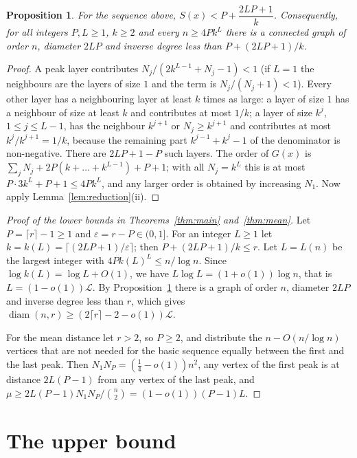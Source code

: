 \documentclass[11pt]{amsart}
\newtheorem{proposition}[theorem]{Proposition}
\theoremstyle{definition}
\theoremstyle{remark}
\newcommand{\diam}{\operatorname{diam}}
\newcommand{\Lz}{\mathcal{L}}
\begin{document}
\begin{proposition}\label{prop:lower}
For the sequence above, $S(x)<P+\dfrac{2LP+1}{k}$.
Consequently, for all integers $P,L\ge1$, $k\ge2$ and every $n\ge 4Pk^L$ there is a connected graph of order $n$, diameter $2LP$ and inverse degree less than $P+(2LP+1)/k$.
\end{proposition}

\begin{proof}
A peak layer contributes $N_j/(2k^{L-1}+N_j-1)<1$ (if $L=1$ the neighbours are the layers of size $1$ and the term is $N_j/(N_j+1)<1$).
Every other layer has a neighbouring layer at least $k$ times as large: a layer of size $1$ has a neighbour of size at least $k$ and contributes at most $1/k$; a layer of size $k^j$, $1\le j\le L-1$, has the neighbour $k^{j+1}$ or $N_j\ge k^{j+1}$ and contributes at most $k^j/k^{j+1}=1/k$, because the remaining part $k^{j-1}+k^j-1$ of the denominator is non-negative.
There are $2LP+1-P$ such layers.
The order of $G(x)$ is $\sum_jN_j+2P(k+\dots+k^{L-1})+P+1$; with all $N_j=k^L$ this is at most $P\cdot3k^L+P+1\le4Pk^L$, and any larger order is obtained by increasing $N_1$.
Now apply Lemma~\ref{lem:reduction}(ii).
\end{proof}

\begin{proof}[Proof of the lower bounds in Theorems~\ref{thm:main} and~\ref{thm:mean}]
Let $P=\lceil r\rceil-1\ge1$ and $\varepsilon=r-P\in(0,1]$.
For an integer $L\ge1$ let $k=k(L)=\lceil(2LP+1)/\varepsilon\rceil$; then $P+(2LP+1)/k\le r$.
Let $L=L(n)$ be the largest integer with $4Pk(L)^L\le n/\log n$.
Since $\log k(L)=\log L+O(1)$, we have $L\log L=(1+o(1))\log n$, that is $L=(1-o(1))\Lz$.
By Proposition~\ref{prop:lower} there is a graph of order $n$, diameter $2LP$ and inverse degree less than $r$, which gives $\diam(n,r)\ge(2\lceil r\rceil-2-o(1))\Lz$.

For the mean distance let $r>2$, so $P\ge2$, and distribute the $n-O(n/\log n)$ vertices that are not needed for the basic sequence equally between the first and the last peak.
Then $N_1N_P=(\tfrac14-o(1))n^2$, any vertex of the first peak is at distance $2L(P-1)$ from any vertex of the last peak, and
$\mu\ge 2L(P-1)N_1N_P/\binom n2=(1-o(1))(P-1)L$.
\end{proof}

\section{The upper bound}
\end{document}
